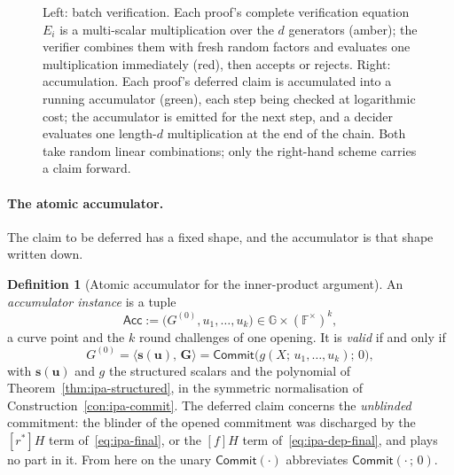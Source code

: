 \documentclass[11pt,a4paper]{article}
\theoremstyle{definition}
\newtheorem{definition}[theorem]{Definition}
\newcommand{\F}{\mathbb{F}}
\newcommand{\G}{\mathbb{G}}
\newcommand{\ip}[2]{\langle #1,\, #2 \rangle}
\newcommand{\Comm}{\mathsf{Commit}}
\newcommand{\Acc}{\ensuremath{\mathsf{Acc}}}
\begin{document}
\begin{figure}[htbp]
\caption{Left: batch verification. Each proof's complete verification
equation $E_i$ is a multi-scalar multiplication over the $d$ generators
(amber); the verifier combines them with fresh random factors and
evaluates one multiplication immediately (red), then accepts or rejects.
Right: accumulation. Each proof's deferred claim is accumulated into a
running accumulator (green), each step being checked at logarithmic
cost; the accumulator is emitted for the next step, and a decider
evaluates one length-$d$ multiplication at the end of the chain. Both
take random linear combinations; only the right-hand scheme carries a
claim forward.}
\label{fig:batch-vs-acc}
\end{figure}

\paragraph{The atomic accumulator.}
The claim to be deferred has a fixed shape, and the accumulator is that
shape written down.

\begin{definition}[Atomic accumulator for the inner-product argument]
\label{def:pcd-ipa-acc}
An \emph{accumulator instance} is a tuple
\[
\Acc := \bigl(G^{(0)}, u_1, \dots, u_k\bigr) \in \G \times (\F^{\times})^{k},
\]
a curve point and the $k$ round challenges of one opening. It is
\emph{valid} if and only if
\begin{equation}\label{eq:pcd-acc-valid}
G^{(0)} = \ip{\mathbf s(\mathbf u)}{\mathbf G}
 = \Comm\bigl(g(X;\, u_1, \dots, u_k);\, 0\bigr),
\end{equation}
with $\mathbf s(\mathbf u)$ and $g$ the structured scalars and the
polynomial of Theorem~\ref{thm:ipa-structured}, in the symmetric
normalisation of Construction~\ref{con:ipa-commit}. The deferred claim
concerns the \emph{unblinded} commitment: the blinder of the opened
commitment was discharged by the $[r^{*}]H$ term
of~\eqref{eq:ipa-final}, or the $[f]H$ term of~\eqref{eq:ipa-dep-final},
and plays no part in it. From here on the unary $\Comm(\cdot)$
abbreviates $\Comm(\cdot\,;\, 0)$.
\end{definition}
\end{document}
